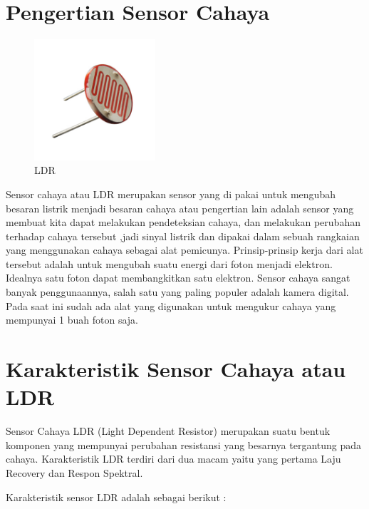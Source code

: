 

\section{Pengertian Sensor Cahaya}

\begin{figure}[ht]
	\centerline{\includegraphics[width=0.4\textwidth]{figures/LDR.jpg}}
	\caption{LDR}
	\label{LDR}
\end{figure}

Sensor cahaya atau LDR merupakan sensor yang di pakai untuk mengubah besaran listrik menjadi besaran cahaya atau pengertian lain adalah  sensor yang membuat kita dapat melakukan pendeteksian cahaya, dan melakukan perubahan terhadap cahaya tersebut ,jadi sinyal listrik dan dipakai dalam sebuah rangkaian yang menggunakan cahaya sebagai alat pemicunya. Prinsip-prinsip kerja dari alat tersebut adalah untuk mengubah suatu energi dari foton menjadi elektron. Idealnya satu foton dapat membangkitkan satu elektron. Sensor cahaya sangat banyak penggunaannya, salah satu yang paling populer adalah kamera digital. Pada saat ini sudah ada alat yang digunakan untuk mengukur cahaya yang mempunyai 1 buah foton saja.

\section{Karakteristik Sensor Cahaya atau LDR}

Sensor Cahaya LDR (Light Dependent Resistor) merupakan suatu bentuk komponen yang mempunyai perubahan resistansi yang besarnya tergantung pada cahaya. Karakteristik LDR terdiri dari dua macam yaitu yang pertama Laju Recovery dan Respon Spektral.

Karakteristik sensor LDR adalah sebagai berikut :

